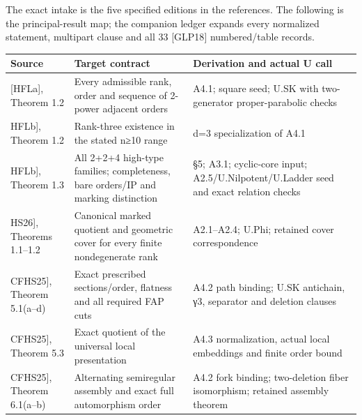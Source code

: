 \documentclass[
  11pt,
  a4paper,
]{article}
\newcounter{none} %
\begin{document}
The exact intake is the five specified editions in the references. The
following is the principal-result map; the companion ledger expands
every normalized statement, multipart clause and all 33 {[}GLP18{]}
numbered/table records.

{\def\LTcaptype{none} %
\begin{longtable}[]{@{}
  >{\raggedright\arraybackslash}p{}
  >{\raggedright\arraybackslash}p{}
  >{\raggedright\arraybackslash}p{}@{}}
\toprule\noalign{}
\begin{minipage}[b]{\linewidth}\raggedright
Source
\end{minipage} & \begin{minipage}[b]{\linewidth}\raggedright
Target contract
\end{minipage} & \begin{minipage}[b]{\linewidth}\raggedright
Derivation and actual U call
\end{minipage} \\
\midrule\noalign{}
\endhead
\bottomrule\noalign{}
\endlastfoot
{[}HFLa{]}, Theorem 1.2 & Every admissible rank, order and sequence of
2-power adjacent orders & A4.1; square seed; U.SK with two-generator
proper-parabolic checks \\
{[}HFLb{]}, Theorem 1.2 & Rank-three existence in the stated n≥10 range
& d=3 specialization of A4.1 \\
{[}HFLb{]}, Theorem 1.3 & All 2+2+4 high-type families; completeness,
bare orders/IP and marking distinction & §5; A3.1; cyclic-core input;
A2.5/U.Nilpotent/U.Ladder seed and exact relation checks \\
{[}HS26{]}, Theorems 1.1--1.2 & Canonical marked quotient and geometric
cover for every finite nondegenerate rank & A2.1--A2.4; U.Phi; retained
cover correspondence \\
{[}CFHS25{]}, Theorem 5.1(a--d) & Exact prescribed sections/order,
flatness and all required FAP cuts & A4.2 path binding; U.SK antichain,
γ3, separator and deletion clauses \\
{[}CFHS25{]}, Theorem 5.3 & Exact quotient of the universal local
presentation & A4.3 normalization, actual local embeddings and finite
order bound \\
{[}CFHS25{]}, Theorem 6.1(a--b) & Alternating semiregular assembly and
exact full automorphism order & A4.2 fork binding; two-deletion fiber
isomorphism; retained assembly theorem \\

\end{longtable}}
\end{document}
